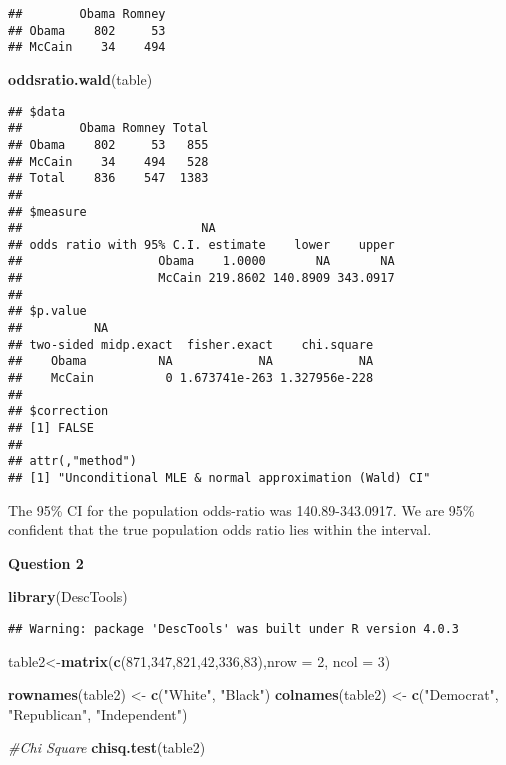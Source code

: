 \documentclass[
]{article}
\newenvironment{Shaded}{\begin{snugshade}}{\end{snugshade}}
\newcommand{\CommentTok}[1]{\textcolor[rgb]{0.56,0.35,0.01}{\textit{#1}}}
\newcommand{\DataTypeTok}[1]{\textcolor[rgb]{0.13,0.29,0.53}{#1}}
\newcommand{\DecValTok}[1]{\textcolor[rgb]{0.00,0.00,0.81}{#1}}
\newcommand{\KeywordTok}[1]{\textcolor[rgb]{0.13,0.29,0.53}{\textbf{#1}}}
\newcommand{\NormalTok}[1]{#1}
\newcommand{\StringTok}[1]{\textcolor[rgb]{0.31,0.60,0.02}{#1}}
\begin{document}
\begin{verbatim}
##        Obama Romney
## Obama    802     53
## McCain    34    494
\end{verbatim}

\begin{Shaded}
\begin{Highlighting}[]
\KeywordTok{oddsratio.wald}\NormalTok{(table)}
\end{Highlighting}
\end{Shaded}

\begin{verbatim}
## $data
##        Obama Romney Total
## Obama    802     53   855
## McCain    34    494   528
## Total    836    547  1383
## 
## $measure
##                         NA
## odds ratio with 95% C.I. estimate    lower    upper
##                   Obama    1.0000       NA       NA
##                   McCain 219.8602 140.8909 343.0917
## 
## $p.value
##          NA
## two-sided midp.exact  fisher.exact    chi.square
##    Obama          NA            NA            NA
##    McCain          0 1.673741e-263 1.327956e-228
## 
## $correction
## [1] FALSE
## 
## attr(,"method")
## [1] "Unconditional MLE & normal approximation (Wald) CI"
\end{verbatim}

The 95\% CI for the population odds-ratio was 140.89-343.0917. We are
95\% confident that the true population odds ratio lies within the
interval.

\textbf{Question 2}

\begin{Shaded}
\begin{Highlighting}[]
\KeywordTok{library}\NormalTok{(DescTools)}
\end{Highlighting}
\end{Shaded}

\begin{verbatim}
## Warning: package 'DescTools' was built under R version 4.0.3
\end{verbatim}

\begin{Shaded}
\begin{Highlighting}[]
\NormalTok{table2<-}\KeywordTok{matrix}\NormalTok{(}\KeywordTok{c}\NormalTok{(}\DecValTok{871}\NormalTok{,}\DecValTok{347}\NormalTok{,}\DecValTok{821}\NormalTok{,}\DecValTok{42}\NormalTok{,}\DecValTok{336}\NormalTok{,}\DecValTok{83}\NormalTok{),}\DataTypeTok{nrow =} \DecValTok{2}\NormalTok{, }\DataTypeTok{ncol =} \DecValTok{3}\NormalTok{)}

\KeywordTok{rownames}\NormalTok{(table2) <-}\StringTok{ }\KeywordTok{c}\NormalTok{(}\StringTok{"White"}\NormalTok{, }\StringTok{"Black"}\NormalTok{)}
\KeywordTok{colnames}\NormalTok{(table2) <-}\StringTok{ }\KeywordTok{c}\NormalTok{(}\StringTok{"Democrat"}\NormalTok{, }\StringTok{"Republican"}\NormalTok{, }\StringTok{"Independent"}\NormalTok{)}

\CommentTok{#Chi Square}
\KeywordTok{chisq.test}\NormalTok{(table2)}
\end{Highlighting}
\end{Shaded}
\end{document}
